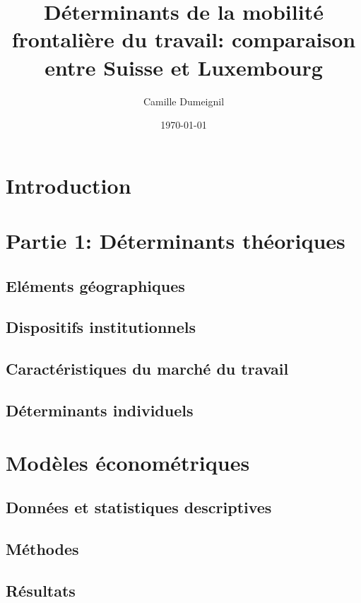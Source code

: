 \documentclass{article}
\title{Déterminants de la mobilité frontalière du travail: comparaison entre Suisse et Luxembourg}
\author{Camille Dumeignil}
\date{\today}
\begin{document}
\maketitle
\tableofcontents %

\section{Introduction}
\section{Partie 1: Déterminants théoriques}
\subsection{Eléments géographiques}
\subsection{Dispositifs institutionnels}
\subsection{Caractéristiques du marché du travail}
\subsection{Déterminants individuels}
\section{Modèles économétriques}
\subsection{Données et statistiques descriptives}
\subsection{Méthodes}
\subsection{Résultats}

\cite{Crozet2009}




\end{document}
